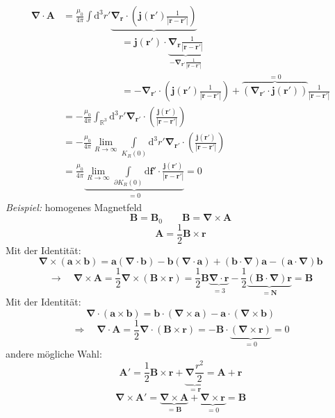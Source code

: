 \documentclass[titlepage,11pt,a4paper,ngerman]{report}
\newcommand{\tx}[1]{\textrm{#1}}
\newcommand{\ub}[1]{\underbrace{#1}}
\newcommand{\ob}[1]{\overbrace{#1}}
\newcommand{\dd}{\tx{d}}
\renewcommand{\vec}[1]{\boldsymbol{#1}}
\newcommand{\vabla}{\boldsymbol{\nabla}}
\begin{document}
\begin{align*}
\vabla \cdot \vec{A} &= \frac{\mu_0}{4 \pi} \int \dd^3 r' \ub{\vabla_{\vec{r}} \cdot \left(\vec{j}(\vec{r}') \frac{1}{|\vec{r} - \vec{r}'|}\right)}\\
& \qquad \qquad \qquad = \vec{j}(\vec{r}') \cdot \ub{\vabla_{\vec{r}} \frac{1}{|\vec{r} - \vec{r}'|}}_{-\vabla_{\vec{r}'} \frac{1}{|\vec{r} - \vec{r}'|}}\\
& \qquad \qquad \qquad = - \vabla_{\vec{r}'} \cdot \left(\vec{j}(\vec{r}') \frac{1}{|\vec{r} - \vec{r}'|}\right) + \ob{\left(\vabla_{\vec{r}'} \cdot \vec{j}(\vec{r}')\right)}^{=0} \frac{1}{|\vec{r} - \vec{r}'|}\\
&= - \frac{\mu_0}{4 \pi} \int_{\mathbb{R}^3} \dd^3 r' \vabla_{\vec{r}'} \cdot \left(\frac{\vec{j}(\vec{r}')}{|\vec{r} - \vec{r}'|}\right)\\
&= - \frac{\mu_0}{4 \pi} \lim\limits_{R \to \infty} \int\limits_{K_R(0)} \dd^3 r' \vabla_{\vec{r}'} \cdot \left(\frac{\vec{j}(\vec{r}')}{|\vec{r} - \vec{r}'|}\right)\\
&= \frac{\mu_0}{4 \pi} \ub{\lim\limits_{R\to \infty} \int\limits_{\partial K_R(0)} \dd \vec{f}' \cdot \frac{\vec{j} (\vec{r}')}{|\vec{r} - \vec{r}'|}}_{=0} = 0
\end{align*}
\emph{Beispiel:} homogenes Magnetfeld
\begin{equation*}
\vec{B} = \vec{B}_0 \qquad \vec{B} = \vabla \times \vec{A}
\end{equation*}
\begin{equation*}
\vec{A} = \frac{1}{2} \vec{B} \times \vec{r}
\end{equation*}
Mit der Identität:
\begin{equation*}
\vabla \times (\vec{a} \times \vec{b}) = \vec{a} (\vabla \cdot \vec{b}) - \vec{b} (\vabla \cdot \vec{a}) + (\vec{b} \cdot \vabla) \vec{a} - (\vec{a} \cdot \vabla) \vec{b}
\end{equation*}
\begin{equation*}
\rightarrow \quad \vabla \times \vec{A} = \frac{1}{2} \vabla \times (\vec{B} \times \vec{r}) = \frac{1}{2} \vec{B} \ub{\vabla \cdot \vec{r}}_{= 3} - \frac{1}{2} \ub{(\vec{B} \cdot \vabla) \vec{r}}_{= \vec{N}} = \vec{B}
\end{equation*}
Mit der Identität:
\begin{equation*}
\vabla \cdot (\vec{a} \times \vec{b}) = \vec{b} \cdot (\vabla \times \vec{a}) - \vec{a} \cdot (\vabla \times \vec{b})
\end{equation*}
\begin{equation*}
\Rightarrow \quad \vabla \cdot \vec{A} = \frac{1}{2} \vabla \cdot \left(\vec{B} \times \vec{r}\right) = - \vec{B} \cdot \ub{\left(\vabla \times \vec{r}\right)}_{= 0} = 0
\end{equation*}
andere mögliche Wahl:
\begin{equation*}
\vec{A}' = \frac{1}{2} \vec{B} \times \vec{r} + \ub{\vabla \frac{r^2}{2}}_{=\vec{r}} = \vec{A} + \vec{r}
\end{equation*}
\begin{equation*}
\vabla \times \vec{A}' = \ub{\vabla \times \vec{A}}_{= \vec{B}} + \ub{\vabla \times \vec{r}}_{= 0} = \vec{B}
\end{equation*}
\end{document}
